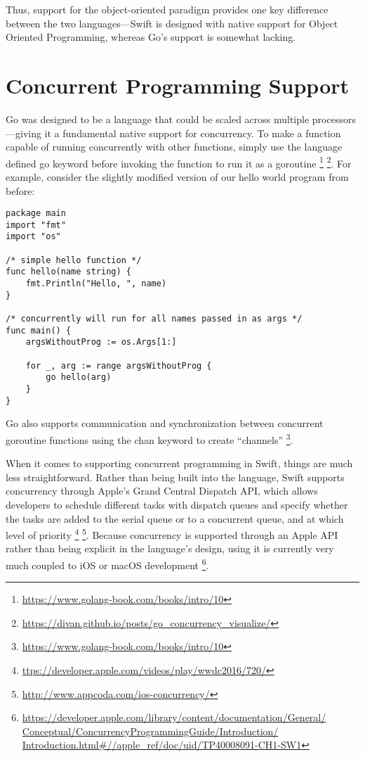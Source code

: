 \documentclass[letterpaper]{article}
\begin{document}
Thus, support for the object-oriented paradigm provides one key difference between the two languages—Swift is designed with native support for Object Oriented Programming, whereas Go’s support is somewhat lacking.

\section{Concurrent Programming Support}

Go was designed to be a language that could be scaled across multiple processors—giving it a fundamental native support for concurrency. To make a function capable of running concurrently with other functions, simply use the language defined go keyword before invoking the function to run it as a goroutine \footnote{\url{https://www.golang-book.com/books/intro/10}} \footnote{\url{https://divan.github.io/posts/go_concurrency_visualize/}}. For example, consider the slightly modified version of our hello world program from before:

\begin{verbatim}
package main
import "fmt"
import "os"

/* simple hello function */
func hello(name string) {
    fmt.Println("Hello, ", name)
}

/* concurrently will run for all names passed in as args */
func main() {
    argsWithoutProg := os.Args[1:]

    for _, arg := range argsWithoutProg {
        go hello(arg)
    }
}
\end{verbatim}

Go also supports communication and synchronization between concurrent goroutine functions using the chan keyword to create “channels” \footnote{\url{https://www.golang-book.com/books/intro/10}}.

When it comes to supporting concurrent programming in Swift, things are much less straightforward. Rather than being built into the language, Swift supports concurrency through Apple’s Grand Central Dispatch API, which allows developers to schedule different tasks with dispatch queues and specify whether the tasks are added to the serial queue or to a concurrent queue, and at which level of priority \footnote{\url{ttps://developer.apple.com/videos/play/wwdc2016/720/}} \footnote{\url{http://www.appcoda.com/ios-concurrency/}}. Because concurrency is supported through an Apple API rather than being explicit in the language’s  design, using it is currently very much coupled to iOS or macOS development \footnote{\url{https://developer.apple.com/library/content/documentation/General/
Conceptual/ConcurrencyProgrammingGuide/Introduction/
Introduction.html#//apple_ref/doc/uid/TP40008091-CH1-SW1}}.
\end{document}
